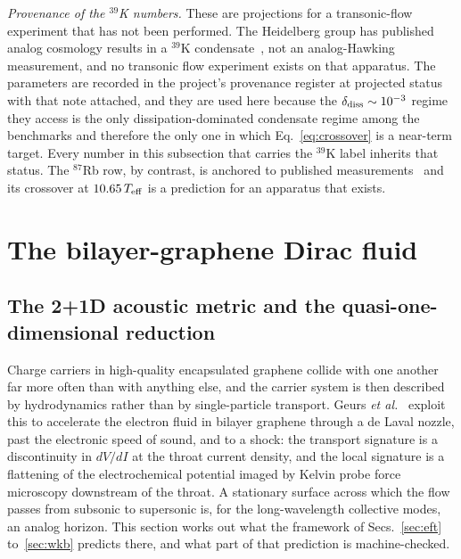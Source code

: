 \documentclass[aps,prd,reprint,nofootinbib,superscriptaddress]{revtex4-2}
\begin{document}
\emph{Provenance of the $^{39}$K numbers.} These are projections for a
transonic-flow experiment that has not been performed. The Heidelberg
group has published analog cosmology results in a $^{39}$K
condensate~\cite{Viermann2022}, not an analog-Hawking measurement, and
no transonic flow experiment exists on that apparatus. The parameters
are recorded in the project's provenance register at projected status
with that note attached, and they are used here because the
$\delta_{\rm diss} \sim 10^{-3}$ regime they access is the only
dissipation-dominated condensate regime among the benchmarks and
therefore the only one in which Eq.~\eqref{eq:crossover} is a near-term
target. Every number in this subsection that carries the $^{39}$K label
inherits that status. The $^{87}$Rb row, by contrast, is anchored to
published measurements~\cite{Steinhauer2016,deNova2019} and its
crossover at $10.65\,T_{\rm eff}$ is a prediction for an apparatus that
exists.


\section{The bilayer-graphene Dirac fluid}
\label{sec:graphene}

\subsection{The 2+1D acoustic metric and the quasi-one-dimensional
reduction}
\label{sec:gr-metric}

Charge carriers in high-quality encapsulated graphene collide with one
another far more often than with anything else, and the carrier system is
then described by hydrodynamics rather than by single-particle transport.
Geurs \emph{et al.}~\cite{Geurs2025} exploit this to accelerate the
electron fluid in bilayer graphene through a de Laval nozzle, past the
electronic speed of sound, and to a shock: the transport signature is a
discontinuity in $dV/dI$ at the throat current density, and the local
signature is a flattening of the electrochemical potential imaged by
Kelvin probe force microscopy downstream of the throat. A stationary
surface across which the flow passes from subsonic to supersonic is, for
the long-wavelength collective modes, an analog horizon. This section
works out what the framework of Secs.~\ref{sec:eft} to~\ref{sec:wkb}
predicts there, and what part of that prediction is machine-checked.
\end{document}
